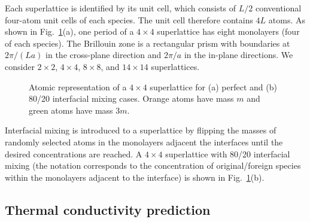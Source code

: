 \documentclass[aps,prb,preprint,preprintnumbers,amsmath,amssymb,floatfix,superscriptaddress]{revtex4}
\begin{document}
Each superlattice is identified by its unit cell, which consists of $L/2$ conventional four-atom unit cells of each species. The unit cell therefore contains $4L$ atoms. As shown in Fig.~\ref{fig:md_domain}(a), one period of a $4\times4$ superlattice has eight monolayers (four of each species). The Brillouin zone is a rectangular prism with boundaries at $2\pi/(La)$ in the cross-plane direction and $2\pi/a$ in the in-plane directions. We consider $2\times2$, $4\times4$, $8\times8$, and $14\times14$ superlattices.
\begin{figure}[t!]
\begin{center}
\renewcommand{\figure}{Fig.}
\caption{Atomic representation of a $4\times4$ superlattice for (a) perfect and (b) 80/20 interfacial mixing cases. Orange atoms have mass  $m$ and green atoms have mass $3m$.}
\label{fig:md_domain}
\end{center}
\end{figure}

Interfacial mixing is introduced to a superlattice by flipping the masses of randomly selected atoms in the monolayers adjacent the interfaces until the desired concentrations are reached.\cite{PhysRevB.79.075316} A $4\times4$ superlattice with 80/20 interfacial mixing (the notation corresponds to the concentration of original/foreign species within the monolayers adjacent to the interface) is shown in Fig.~\ref{fig:md_domain}(b).

\subsection{Thermal conductivity prediction}\label{SEC:methods}
\end{document}
